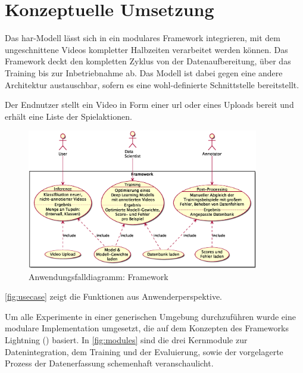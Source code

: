 \section{Konzeptuelle Umsetzung}
\label{sec:konzeptuelle-umsetzung}

Das \gls{har}-Modell lässt sich in ein modulares Framework integrieren, mit dem ungeschnittene Videos kompletter Halbzeiten verarbeitet werden können.
Das Framework deckt den kompletten Zyklus von der Datenaufbereitung, über das Training bis zur Inbetriebnahme ab.
Das Modell ist dabei gegen eine andere Architektur austauschbar, sofern es eine wohl-definierte Schnittstelle bereitstellt.

Der Endnutzer stellt ein Video in Form einer \gls{url} oder eines Uploads bereit und erhält eine Liste der Spielaktionen.

\begin{figure}[htbp!]
    \centering
    \includegraphics[width=0.9\textwidth, height=0.8\textwidth, keepaspectratio, interpolate]{fig/usecase.eps}
    \caption{Anwendungsfalldiagramm: Framework}
    \label{fig:usecase}
\end{figure}

\autoref{fig:usecase} zeigt die Funktionen aus Anwenderperspektive.

Um alle Experimente in einer generischen Umgebung durchzuführen wurde eine modulare Implementation umgesetzt, die auf dem Konzepten des Frameworks Lightning (\cite{Falcon19}) basiert.
In \autoref{fig:modules} sind die drei Kernmodule zur Datenintegration, dem Training und der Evaluierung, sowie der vorgelagerte Prozess der Datenerfassung schemenhaft veranschaulicht.

